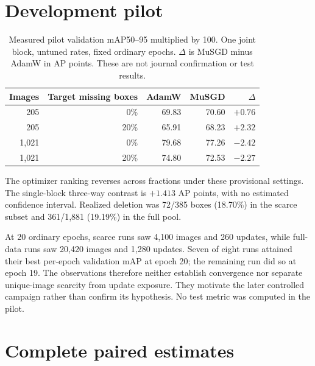 \documentclass[11pt,a4paper]{article}
\begin{document}
\appendix
\section{Development pilot}
\begin{table}[ht]
\centering
\caption{Measured pilot validation mAP50--95 multiplied by 100. One joint block, untuned rates, fixed ordinary epochs. $\Delta$ is MuSGD minus AdamW in AP points. These are not journal confirmation or test results.}
\begin{tabular}{rrrrr}
\toprule
Images & Target missing boxes & AdamW & MuSGD & $\Delta$\\
\midrule
205 & 0\% & 69.83 & 70.60 & $+0.76$\\
205 & 20\% & 65.91 & 68.23 & $+2.32$\\
1,021 & 0\% & 79.68 & 77.26 & $-2.42$\\
1,021 & 20\% & 74.80 & 72.53 & $-2.27$\\
\bottomrule
\end{tabular}
\end{table}

The optimizer ranking reverses across fractions under these provisional settings. The single-block three-way contrast is $+1.413$ AP points, with no estimated confidence interval. Realized deletion was 72/385 boxes (18.70\%) in the scarce subset and 361/1,881 (19.19\%) in the full pool.

At 20 ordinary epochs, scarce runs saw 4,100 images and 260 updates, while full-data runs saw 20,420 images and 1,280 updates. Seven of eight runs attained their best per-epoch validation mAP at epoch 20; the remaining run did so at epoch 19. The observations therefore neither establish convergence nor separate unique-image scarcity from update exposure. They motivate the later controlled campaign rather than confirm its hypothesis. No test metric was computed in the pilot.


\section{Complete paired estimates}
\begingroup\small

\endgroup
\end{document}
